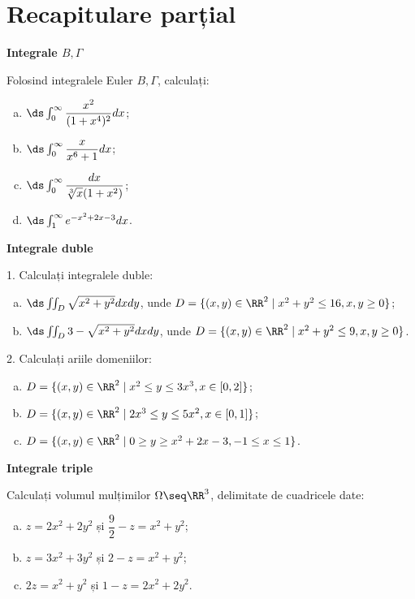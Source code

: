 
\chapter{Recapitulare parțial}

\indent\indent \textbf{Integrale $ B, \Gamma $}

Folosind integralele Euler $ B, \Gamma $, calculați:

\begin{enumerate}[(a)]
    \item $ \ds\int_0^\infty \dfrac{x^2}{(1 + x^4)^2} dx $;
    \item $ \ds\int_0^\infty \dfrac{x}{x^6 + 1} dx $;
    \item $ \ds\int_0^\infty \dfrac{dx}{\sqrt[3]{x}(1 + x^2)} $;
    \item $ \ds\int_{1}^\infty e^{-x^2 + 2x - 3} dx $.
\end{enumerate}

\vspace{0.3cm}

\textbf{Integrale duble}

1. Calculați integralele duble:

\begin{enumerate}[(a)]
    \item $ \ds\iint_D \sqrt{x^2 + y^2} dxdy $, unde $ D = \{ (x, y) \in \RR^2 \mid x^2 + y^2 \leq 16, x, y \geq 0 \} $;
    \item $ \ds\iint_D 3 - \sqrt{x^2 + y^2} dxdy $, unde $ D = \{ (x, y) \in \RR^2 \mid x^2 + y^2 \leq 9, x, y \geq 0 \} $.
\end{enumerate}

2. Calculați ariile domeniilor:
\begin{enumerate}[(a)]
    \item $ D = \{ (x, y) \in \RR^2 \mid x^2 \leq y \leq 3x^3, x \in [0,2] \} $;
    \item $ D = \{ (x, y) \in \RR^2 \mid 2x^3 \leq y \leq 5x^2, x \in [0, 1] \} $;
    \item $ D = \{ (x, y) \in \RR^2 \mid 0 \geq y \geq x^2 + 2x - 3, -1 \leq x \leq 1 \} $.
\end{enumerate}

\vspace{0.3cm}

\textbf{Integrale triple}

Calculați volumul mulțimilor $ \Omega \seq \RR^3 $, delimitate de cuadricele date:
\begin{enumerate}[(a)]
    \item $ z = 2x^2 + 2y^2 $ și $ \dfrac{9}{2} - z = x^2 + y^2 $;
    \item $ z = 3x^2 + 3y^2 $ și $ 2 - z = x^2 + y^2 $;
    \item $ 2z = x^2 + y^2 $ și $ 1 - z = 2x^2 + 2y^2 $.
\end{enumerate}

